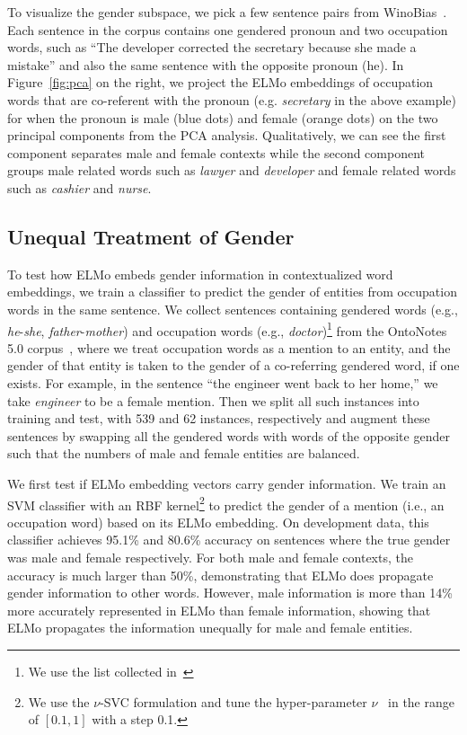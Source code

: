 \documentclass[11pt,a4paper]{article}
\newcommand{\word}[1]{\textit{#1}}
\begin{document}
To visualize the gender subspace, we pick a few sentence pairs from WinoBias~\cite{ZWYOC18}.
Each sentence in the corpus contains one gendered pronoun and two occupation words, such as
``The developer corrected the secretary because she made a mistake'' and also the same sentence with the opposite pronoun (he). %
In Figure~\ref{fig:pca} on the right, we project the ELMo embeddings of occupation words that are co-referent with the pronoun (e.g. \textit{secretary} in the above example) for when the pronoun is male (blue dots) and female (orange dots) on the two principal components from the PCA analysis.
Qualitatively, we can see the first component separates male and female contexts while the second component groups male related words such as \textit{lawyer} and \textit{developer} and female related words such as \textit{cashier} and \textit{nurse}.

\subsection{Unequal Treatment of Gender}
\label{sec:classifier}
To test how ELMo embeds gender information in contextualized word embeddings, we train a classifier to predict the gender of entities from occupation words in the same sentence.
We collect sentences containing gendered words (e.g., \word{he}-\word{she}, \word{father}-\word{mother}) and occupation words (e.g., \word{doctor})\footnote{We use the list collected in~\cite{ZWYOC18}} from the OntoNotes 5.0 corpus~\cite{weischedel2012ontonotes}, where
we treat occupation words as a mention to an entity, and the gender of that entity is taken to the gender of a co-referring gendered word, if one exists.
For example, in the sentence ``the engineer went back to her home,'' we take \word{engineer} to be a female mention.
Then we split all such instances into training and test, with 539 and 62 instances, respectively and augment these sentences by swapping all the gendered words with words of the opposite gender such that the numbers of male and female entities are balanced.

We first test if ELMo embedding vectors carry gender information. We train an SVM classifier with an RBF kernel\footnote{We use the $\nu$-SVC formulation and tune the hyper-parameter $\nu$~\cite{chang2011libsvm} in the range of $[0.1, 1]$ with a step 0.1.} to predict the gender of a mention (i.e., an occupation word) based on its ELMo embedding.
On development data, this classifier achieves 95.1\% and 80.6\% accuracy on sentences where the true gender was male and female respectively.
For both male and female contexts, the accuracy is much larger than 50\%, demonstrating that ELMo does propagate gender information to other words.
However, male information is more than 14\% more accurately represented in ELMo than female information, showing that ELMo propagates the information unequally for male and female entities.
\end{document}
